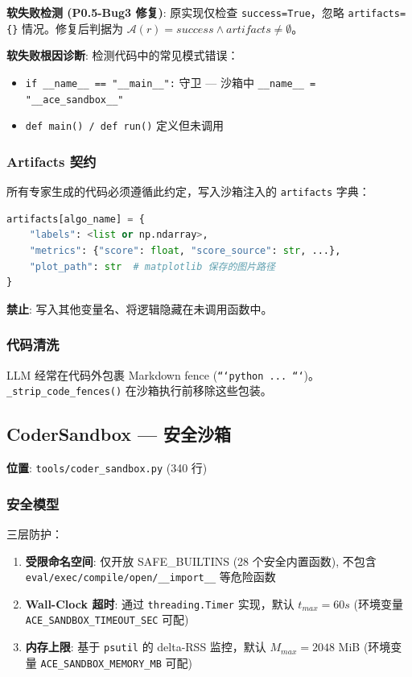 \documentclass[12pt,a4paper]{article}
\begin{document}
\textbf{软失败检测 (P0.5-Bug3 修复)}: 原实现仅检查 \texttt{success=True}，忽略 \texttt{artifacts=\{\}} 情况。修复后判据为 $\mathcal{A}(r) = success \wedge artifacts \neq \emptyset$。

\textbf{软失败根因诊断}: 检测代码中的常见模式错误：
\begin{itemize}[nosep]
    \item \texttt{if \_\_name\_\_ == "\_\_main\_\_":} 守卫 --- 沙箱中 \texttt{\_\_name\_\_ = "\_\_ace\_sandbox\_\_"}
    \item \texttt{def main() / def run()} 定义但未调用
\end{itemize}

\subsubsection{Artifacts 契约}

所有专家生成的代码必须遵循此约定，写入沙箱注入的 \texttt{artifacts} 字典：

\begin{lstlisting}[language=Python]
artifacts[algo_name] = {
    "labels": <list or np.ndarray>,
    "metrics": {"score": float, "score_source": str, ...},
    "plot_path": str  # matplotlib 保存的图片路径
}
\end{lstlisting}

\textbf{禁止}: 写入其他变量名、将逻辑隐藏在未调用函数中。

\subsubsection{代码清洗}

LLM 经常在代码外包裹 Markdown fence (\texttt{```python ... ```})。\texttt{\_strip\_code\_fences()} 在沙箱执行前移除这些包装。

\subsection{CoderSandbox --- 安全沙箱}

\textbf{位置}: \texttt{tools/coder\_sandbox.py} (340 行)

\subsubsection{安全模型}

三层防护：

\begin{enumerate}[nosep]
    \item \textbf{受限命名空间}: 仅开放 SAFE\_BUILTINS (28 个安全内置函数), 不包含 \texttt{eval/exec/compile/open/\_\_import\_\_} 等危险函数
    \item \textbf{Wall-Clock 超时}: 通过 \texttt{threading.Timer} 实现，默认 $t_{max} = 60s$ (环境变量 \texttt{ACE\_SANDBOX\_TIMEOUT\_SEC} 可配)
    \item \textbf{内存上限}: 基于 \texttt{psutil} 的 delta-RSS 监控，默认 $M_{max} = 2048$ MiB (环境变量 \texttt{ACE\_SANDBOX\_MEMORY\_MB} 可配)
\end{enumerate}
\end{document}

